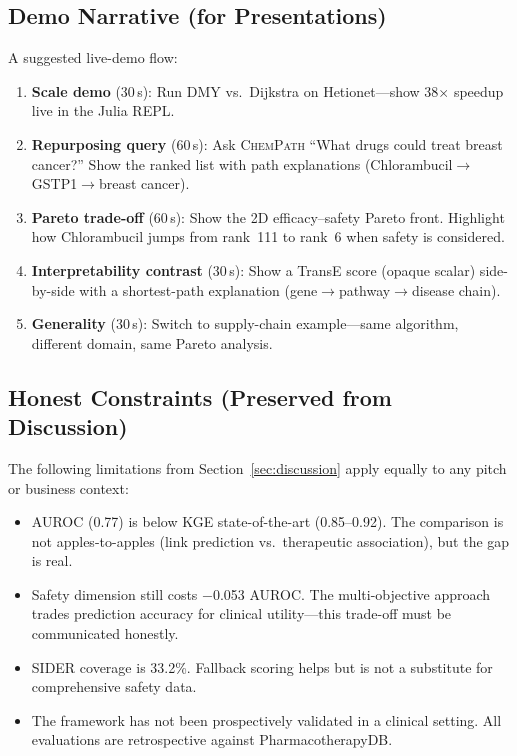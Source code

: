 \documentclass[11pt,a4paper]{article}
\newcommand{\chempath}{\textsc{ChemPath}}
\begin{document}
\subsection{Demo Narrative (for Presentations)}

A suggested live-demo flow:

\begin{enumerate}
    \item \textbf{Scale demo} (30\,s): Run DMY vs.\ Dijkstra on
    Hetionet---show 38$\times$ speedup live in the Julia REPL.

    \item \textbf{Repurposing query} (60\,s): Ask \chempath{}
    ``What drugs could treat breast cancer?''  Show the ranked
    list with path explanations (Chlorambucil$\to$GSTP1$\to$breast
    cancer).

    \item \textbf{Pareto trade-off} (60\,s): Show the 2D
    efficacy--safety Pareto front.  Highlight how Chlorambucil
    jumps from rank~111 to rank~6 when safety is considered.

    \item \textbf{Interpretability contrast} (30\,s): Show a
    TransE score (opaque scalar) side-by-side with a shortest-path
    explanation (gene$\to$pathway$\to$disease chain).

    \item \textbf{Generality} (30\,s): Switch to supply-chain
    example---same algorithm, different domain, same Pareto
    analysis.
\end{enumerate}

\subsection{Honest Constraints (Preserved from Discussion)}

The following limitations from Section~\ref{sec:discussion} apply
equally to any pitch or business context:

\begin{itemize}
    \item AUROC (0.77) is below KGE state-of-the-art (0.85--0.92).
    The comparison is not apples-to-apples (link prediction vs.\
    therapeutic association), but the gap is real.

    \item Safety dimension still costs $-$0.053 AUROC.  The
    multi-objective approach trades prediction accuracy for
    clinical utility---this trade-off must be communicated honestly.

    \item SIDER coverage is 33.2\%.  Fallback scoring helps but is
    not a substitute for comprehensive safety data.

    \item The framework has not been prospectively validated in a
    clinical setting.  All evaluations are retrospective against
    PharmacotherapyDB.
\end{itemize}
\end{document}
